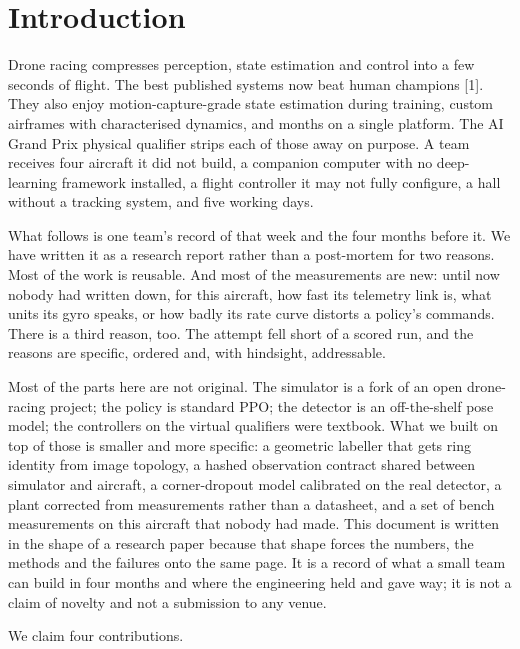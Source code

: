\documentclass{article}
\begin{document}
\section{Introduction}
Drone racing compresses perception, state estimation and control into a few seconds of flight. The best published systems now beat human champions [1]. They also enjoy motion-capture-grade state estimation during training, custom airframes with characterised dynamics, and months on a single platform. The AI Grand Prix physical qualifier strips each of those away on purpose. A team receives four aircraft it did not build, a companion computer with no deep-learning framework installed, a flight controller it may not fully configure, a hall without a tracking system, and five working days.

What follows is one team's record of that week and the four months before it. We have written it as a research report rather than a post-mortem for two reasons. Most of the work is reusable. And most of the measurements are new: until now nobody had written down, for this aircraft, how fast its telemetry link is, what units its gyro speaks, or how badly its rate curve distorts a policy's commands. There is a third reason, too. The attempt fell short of a scored run, and the reasons are specific, ordered and, with hindsight, addressable.

Most of the parts here are not original. The simulator is a fork of an open drone-racing project; the policy is standard PPO; the detector is an off-the-shelf pose model; the controllers on the virtual qualifiers were textbook. What we built on top of those is smaller and more specific: a geometric labeller that gets ring identity from image topology, a hashed observation contract shared between simulator and aircraft, a corner-dropout model calibrated on the real detector, a plant corrected from measurements rather than a datasheet, and a set of bench measurements on this aircraft that nobody had made. This document is written in the shape of a research paper because that shape forces the numbers, the methods and the failures onto the same page. It is a record of what a small team can build in four months and where the engineering held and gave way; it is not a claim of novelty and not a submission to any venue.

We claim four contributions.
\end{document}
